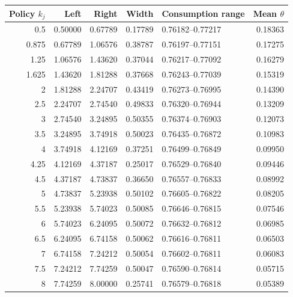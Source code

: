 \begin{tabular}{rrrrlr}
\toprule
Policy $k_j$ & Left & Right & Width & Consumption range & Mean $\theta$ \\
\midrule
0.5 & 0.50000 & 0.67789 & 0.17789 & 0.76182--0.77217 & 0.18363 \\
0.875 & 0.67789 & 1.06576 & 0.38787 & 0.76197--0.77151 & 0.17275 \\
1.25 & 1.06576 & 1.43620 & 0.37044 & 0.76217--0.77092 & 0.16279 \\
1.625 & 1.43620 & 1.81288 & 0.37668 & 0.76243--0.77039 & 0.15319 \\
2 & 1.81288 & 2.24707 & 0.43419 & 0.76273--0.76995 & 0.14390 \\
2.5 & 2.24707 & 2.74540 & 0.49833 & 0.76320--0.76944 & 0.13209 \\
3 & 2.74540 & 3.24895 & 0.50355 & 0.76374--0.76903 & 0.12073 \\
3.5 & 3.24895 & 3.74918 & 0.50023 & 0.76435--0.76872 & 0.10983 \\
4 & 3.74918 & 4.12169 & 0.37251 & 0.76499--0.76849 & 0.09950 \\
4.25 & 4.12169 & 4.37187 & 0.25017 & 0.76529--0.76840 & 0.09446 \\
4.5 & 4.37187 & 4.73837 & 0.36650 & 0.76557--0.76833 & 0.08992 \\
5 & 4.73837 & 5.23938 & 0.50102 & 0.76605--0.76822 & 0.08205 \\
5.5 & 5.23938 & 5.74023 & 0.50085 & 0.76646--0.76815 & 0.07546 \\
6 & 5.74023 & 6.24095 & 0.50072 & 0.76632--0.76812 & 0.06985 \\
6.5 & 6.24095 & 6.74158 & 0.50062 & 0.76616--0.76811 & 0.06503 \\
7 & 6.74158 & 7.24212 & 0.50054 & 0.76602--0.76811 & 0.06083 \\
7.5 & 7.24212 & 7.74259 & 0.50047 & 0.76590--0.76814 & 0.05715 \\
8 & 7.74259 & 8.00000 & 0.25741 & 0.76579--0.76818 & 0.05389 \\
\bottomrule
\end{tabular}
